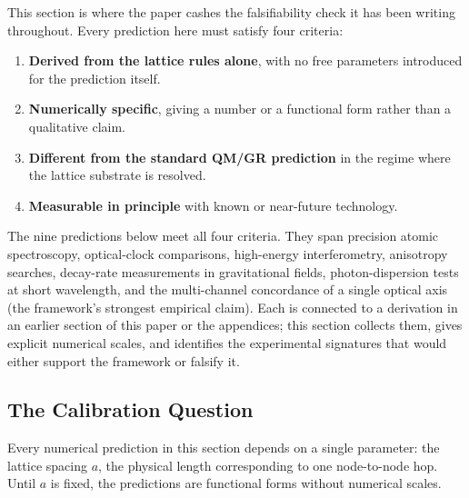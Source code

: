 
\label{sec:predictions}

This section is where the paper cashes the falsifiability check it
has been writing throughout. Every prediction here must satisfy four
criteria:

\begin{enumerate}
    \item \textbf{Derived from the lattice rules alone}, with no free
    parameters introduced for the prediction itself.
    \item \textbf{Numerically specific}, giving a number or a
    functional form rather than a qualitative claim.
    \item \textbf{Different from the standard QM/GR prediction} in
    the regime where the lattice substrate is resolved.
    \item \textbf{Measurable in principle} with known or near-future
    technology.
\end{enumerate}

The nine predictions below meet all four criteria. They span
precision atomic spectroscopy, optical-clock comparisons,
high-energy interferometry, anisotropy searches, decay-rate
measurements in gravitational fields, photon-dispersion tests at
short wavelength, and the multi-channel concordance of a single
optical axis (the framework's strongest empirical claim). Each is
connected to a derivation in an earlier section of this paper or
the appendices; this section collects them, gives explicit
numerical scales, and identifies the experimental signatures that
would either support the framework or falsify it.

\subsection{The Calibration Question}
\label{subsec:calibration_question}

Every numerical prediction in this section depends on a single
parameter: the lattice spacing $a$, the physical length corresponding
to one node-to-node hop. Until $a$ is fixed, the predictions are
functional forms without numerical scales.

